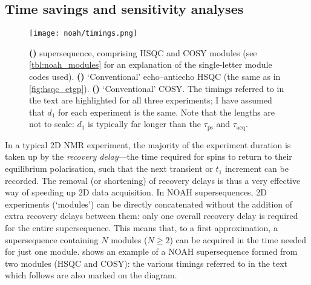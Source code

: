 \subsection{Time savings and sensitivity analyses}
\label{subsec:noah__snr}

\begin{figure}[htb]
    \centering
    \texttt{[image: noah/timings.png]}%
    {\label{fig:noah_timings_noah_sc}}%
    {\label{fig:noah_timings_conv_s}}%
    {\label{fig:noah_timings_conv_c}}%
    \caption[Comparison of NOAH and conventional 2D experiments]{
        \textbf{()}  supersequence, comprising HSQC and COSY modules (see \cref{tbl:noah_modules} for an explanation of the single-letter module codes used).
        \textbf{()} `Conventional' echo--antiecho HSQC (the same as in \cref{fig:hsqc_etgp}).
        \textbf{()} `Conventional' COSY.
        The timings referred to in the text are highlighted for all three experiments; I have assumed that $d_1$ for each experiment is the same.
        Note that the lengths are not to scale: $d_1$ is typically far longer than the $\tau_\text{ps}$ and $\tau_\text{acq}$.
    }
    \label{fig:noah_timings}
\end{figure}

In a typical 2D NMR experiment, the majority of the experiment duration is taken up by the \textit{recovery delay}---the time required for spins to return to their equilibrium polarisation, such that the next transient or $t_1$ increment can be recorded.
The removal (or shortening) of recovery delays is thus a very effective way of speeding up 2D data acquisition.
In NOAH supersequences, 2D experiments (`modules') can be directly concatenated without the addition of extra recovery delays between them: only one overall recovery delay is required for the entire supersequence.
This means that, to a first approximation, a supersequence containing $N$ modules ($N \geq 2$) can be acquired in the time needed for just one module.
 shows an example of a NOAH supersequence formed from two modules (HSQC and COSY): the various timings referred to in the text which follows are also marked on the diagram.

